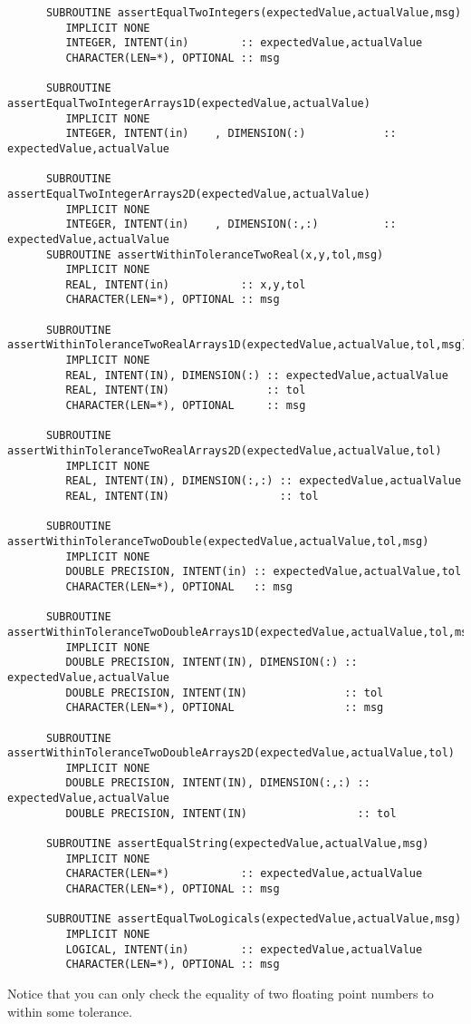\documentclass[9pt]{article}
\begin{document}
	{\color{blue}\begin{verbatim}
      SUBROUTINE assertEqualTwoIntegers(expectedValue,actualValue,msg)  
         IMPLICIT NONE  
         INTEGER, INTENT(in)        :: expectedValue,actualValue
         CHARACTER(LEN=*), OPTIONAL :: msg
         
      SUBROUTINE assertEqualTwoIntegerArrays1D(expectedValue,actualValue)  
         IMPLICIT NONE  
         INTEGER, INTENT(in)    , DIMENSION(:)            :: expectedValue,actualValue
         
      SUBROUTINE assertEqualTwoIntegerArrays2D(expectedValue,actualValue)  
         IMPLICIT NONE  
         INTEGER, INTENT(in)    , DIMENSION(:,:)          :: expectedValue,actualValue
      SUBROUTINE assertWithinToleranceTwoReal(x,y,tol,msg)  
         IMPLICIT NONE  
         REAL, INTENT(in)           :: x,y,tol
         CHARACTER(LEN=*), OPTIONAL :: msg
         
      SUBROUTINE assertWithinToleranceTwoRealArrays1D(expectedValue,actualValue,tol,msg)  
         IMPLICIT NONE  
         REAL, INTENT(IN), DIMENSION(:) :: expectedValue,actualValue
         REAL, INTENT(IN)               :: tol
         CHARACTER(LEN=*), OPTIONAL     :: msg
         
      SUBROUTINE assertWithinToleranceTwoRealArrays2D(expectedValue,actualValue,tol)  
         IMPLICIT NONE  
         REAL, INTENT(IN), DIMENSION(:,:) :: expectedValue,actualValue
         REAL, INTENT(IN)                 :: tol
         
      SUBROUTINE assertWithinToleranceTwoDouble(expectedValue,actualValue,tol,msg)  
         IMPLICIT NONE  
         DOUBLE PRECISION, INTENT(in) :: expectedValue,actualValue,tol
         CHARACTER(LEN=*), OPTIONAL   :: msg
         
      SUBROUTINE assertWithinToleranceTwoDoubleArrays1D(expectedValue,actualValue,tol,msg)  
         IMPLICIT NONE  
         DOUBLE PRECISION, INTENT(IN), DIMENSION(:) :: expectedValue,actualValue
         DOUBLE PRECISION, INTENT(IN)               :: tol
         CHARACTER(LEN=*), OPTIONAL                 :: msg
         
      SUBROUTINE assertWithinToleranceTwoDoubleArrays2D(expectedValue,actualValue,tol)  
         IMPLICIT NONE  
         DOUBLE PRECISION, INTENT(IN), DIMENSION(:,:) :: expectedValue,actualValue
         DOUBLE PRECISION, INTENT(IN)                 :: tol
         
      SUBROUTINE assertEqualString(expectedValue,actualValue,msg)
         IMPLICIT NONE
         CHARACTER(LEN=*)           :: expectedValue,actualValue
         CHARACTER(LEN=*), OPTIONAL :: msg
         
      SUBROUTINE assertEqualTwoLogicals(expectedValue,actualValue,msg)  
         IMPLICIT NONE  
         LOGICAL, INTENT(in)        :: expectedValue,actualValue
         CHARACTER(LEN=*), OPTIONAL :: msg
	\end{verbatim}}
	Notice that you can only check the equality of two floating point numbers to within some tolerance.
\end{document}
